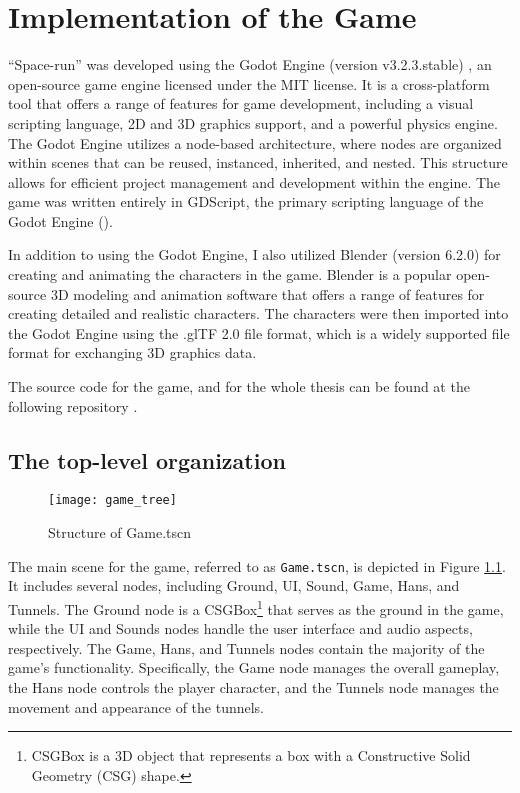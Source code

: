 \chapter{Implementation of the Game}
``Space-run'' was developed using the Godot Engine (version v3.2.3.stable) , an open-source game engine licensed under the MIT license. It is a cross-platform tool that offers a range of features for game development, including a visual scripting language, 2D and 3D graphics support, and a powerful physics engine. The Godot Engine utilizes a node-based architecture, where nodes are organized within scenes that can be reused, instanced, inherited, and nested. This structure allows for efficient project management and development within the engine. The game was written entirely in GDScript, the primary scripting language of the Godot Engine (\cite{GodotDocs}).

In addition to using the Godot Engine, I also utilized Blender (version 6.2.0) \cite{blender} for creating and animating the characters in the game. Blender is a popular open-source 3D modeling and animation software that offers a range of features for creating detailed and realistic characters. The characters were then imported into the Godot Engine using the .glTF 2.0 \cite{gltf} file format, which is a widely supported file format for exchanging 3D graphics data.

The source code for the game, and for the whole thesis can be found at the following repository \cite{spacerunai}.

\section{The top-level organization}
\begin{figure}[h]
    \centering
    \texttt{[image: game\_tree]}
    \caption{Structure of Game.tscn}
    \label{fig:game_tree}
\end{figure}

The main scene for the game, referred to as \texttt{Game.tscn}, is depicted in Figure \ref{fig:game_tree}. It includes several nodes, including Ground, UI, Sound, Game, Hans, and Tunnels. The Ground node is a CSGBox\footnote{CSGBox is a 3D object that represents a box with a Constructive Solid Geometry (CSG) shape.} that serves as the ground in the game, while the UI and Sounds nodes handle the user interface and audio aspects, respectively. The Game, Hans, and Tunnels nodes contain the majority of the game's functionality. Specifically, the Game node manages the overall gameplay, the Hans node controls the player character, and the Tunnels node manages the movement and appearance of the tunnels.

